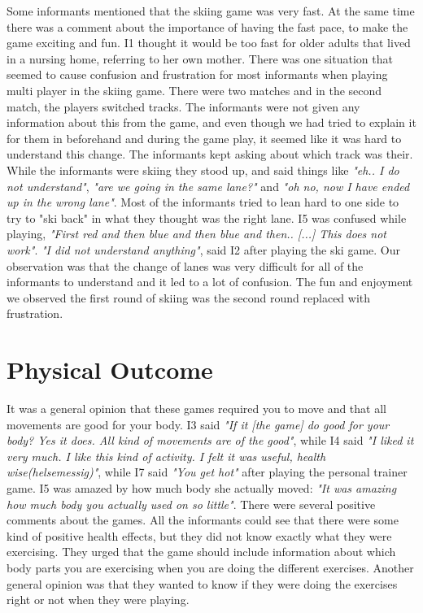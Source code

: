 Some informants mentioned that the skiing game was very fast. At the same time there was a comment about the importance of having the fast pace, to make the game exciting and fun. I1 thought it would be too fast for older adults that lived in a nursing home, referring to her own mother. There was one situation that seemed to cause confusion and frustration for most informants when playing multi player in the skiing game. There were two matches and in the second match, the players switched tracks. The informants were not given any information about this from the game, and even though we had tried to explain it for them in beforehand and during the game play, it seemed like it was hard to understand this change. The informants kept asking about which track was their. While the informants were skiing they stood up, and said things like \emph{"eh.. I do not understand"}, \emph{"are we going in the same lane?"} and \emph{"oh no, now I have ended up in the wrong lane"}. Most of the informants tried to lean hard to one side to try to "ski back" in what they thought was the right lane. I5 was confused while playing, \emph{"First red and then blue and then blue and then.. [...] This does not work"}. \emph{"I did not understand anything"}, said I2 after playing the ski game. Our observation was that the change of lanes was very difficult for all of the informants to understand and it led to a lot of confusion. The fun and enjoyment we observed the first round of skiing was the second round replaced with frustration. 

\section{Physical Outcome}

It was a general opinion that these games required you to move and that all movements are good for your body. I3 said \emph{"If it [the game] do good for your body? Yes it does. All kind of movements are of the good"}, while I4 said  \emph{"I liked it very much. I like this kind of activity. I felt it was useful, health wise(helsemessig)"}, while I7 said \emph{"You get hot"} after playing the personal trainer game. I5 was amazed by how much body she actually moved: \emph{"It was amazing how much body you actually used on so little"}. There were several positive comments about the games. All the informants could see that there were some kind of positive health effects, but they did not know exactly what they were exercising. They urged that the game should include information about which body parts you are exercising when you are doing the different exercises. Another general opinion was that they wanted to know if they were doing the exercises right or not when they were playing. 

